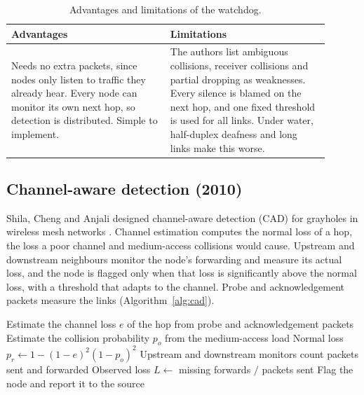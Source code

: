 \documentclass{article}
\begin{document}
\begin{table}[htbp]
\centering\footnotesize\renewcommand{\arraystretch}{1.1}
\begin{tabular}{|p{0.45\linewidth}|p{0.45\linewidth}|}
\hline
\textbf{Advantages} & \textbf{Limitations} \\
\hline
Needs no extra packets, since nodes only listen to traffic they already hear. Every node can monitor its own next hop, so detection is distributed. Simple to implement. & The authors list ambiguous collisions, receiver collisions and partial dropping as weaknesses. Every silence is blamed on the next hop, and one fixed threshold is used for all links. Under water, half-duplex deafness and long links make this worse. \\
\hline
\end{tabular}
\caption{Advantages and limitations of the watchdog.}
\end{table}

\subsection{Channel-aware detection (2010)}\label{sec:cad}
\noindent
Shila, Cheng and Anjali designed channel-aware detection (CAD) for grayholes in wireless mesh networks \cite{shila2010}. Channel estimation computes the normal loss of a hop, the loss a poor channel and medium-access collisions would cause. Upstream and downstream neighbours monitor the node's forwarding and measure its actual loss, and the node is flagged only when that loss is significantly above the normal loss, with a threshold that adapts to the channel. Probe and acknowledgement packets measure the links (Algorithm~\ref{alg:cad}).

\begin{algorithm}[htbp]
\small
\caption{Channel-aware detection for one monitored hop}\label{alg:cad}
\begin{algorithmic}[1]
\State Estimate the channel loss $e$ of the hop from probe and acknowledgement packets
\State Estimate the collision probability $p_o$ from the medium-access load
\State Normal loss $p_r \gets 1-(1-e)^2(1-p_o)^2$
\State Upstream and downstream monitors count packets sent and forwarded
\State Observed loss $L \gets$ missing forwards $/$ packets sent
  \State Flag the node and report it to the source
\EndIf
\end{algorithmic}
\end{algorithm}
\end{document}
